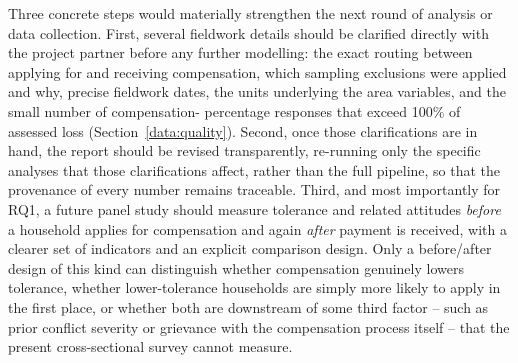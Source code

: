 Three concrete steps would materially strengthen the next round of analysis
or data collection. First, several fieldwork details should be clarified
directly with the project partner before any further modelling: the exact
routing between applying for and receiving compensation, which sampling
exclusions were applied and why, precise fieldwork dates, the units
underlying the area variables, and the small number of compensation-
percentage responses that exceed 100\% of assessed loss
(Section~\ref{data:quality}). Second, once those clarifications are in hand,
the report should be revised transparently, re-running only the specific
analyses that those clarifications affect, rather than the full pipeline,
so that the provenance of every number remains traceable. Third, and most
importantly for RQ1, a future panel study should measure tolerance and
related attitudes \emph{before} a household applies for compensation and
again \emph{after} payment is received, with a clearer set of indicators and
an explicit comparison design. Only a before/after design of this kind can
distinguish whether compensation genuinely lowers tolerance, whether
lower-tolerance households are simply more likely to apply in the first
place, or whether both are downstream of some third factor -- such as prior
conflict severity or grievance with the compensation process itself -- that
the present cross-sectional survey cannot measure.
